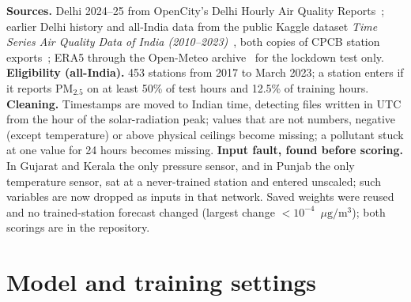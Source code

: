 \documentclass{article}
\newcommand{\pmu}{\ensuremath{\mu\mathrm{g/m^3}}}
\newcommand{\pmtf}{PM$_{2.5}$}
\begin{document}
\textbf{Sources.} Delhi 2024--25 from OpenCity's Delhi Hourly Air Quality Reports~\citep{opencity}; earlier Delhi
history and all-India data from the public Kaggle dataset \emph{Time Series Air Quality Data of India
(2010--2023)}~\citep{kaggleaq}, both copies of CPCB station exports~\citep{cpcb}; ERA5 through the Open-Meteo
archive~\citep{openmeteo} for the lockdown test only. \textbf{Eligibility (all-India).} 453 stations from 2017 to March
2023; a station enters if it reports \pmtf{} on at least 50\% of test hours and 12.5\% of training hours.
\textbf{Cleaning.} Timestamps are moved to Indian time, detecting files written in UTC from the hour of the
solar-radiation peak; values that are not numbers, negative (except temperature) or above physical ceilings become
missing; a pollutant stuck at one value for 24 hours becomes missing. \textbf{Input fault, found before scoring.} In
Gujarat and Kerala the only pressure sensor, and in Punjab the only temperature sensor, sat at a never-trained station
and entered unscaled; such variables are now dropped as inputs in that network. Saved weights were reused and no
trained-station forecast changed (largest change $<10^{-4}$~\pmu); both scorings are in the repository.

\section{Model and training settings}
\label{app:hparams}
\end{document}

